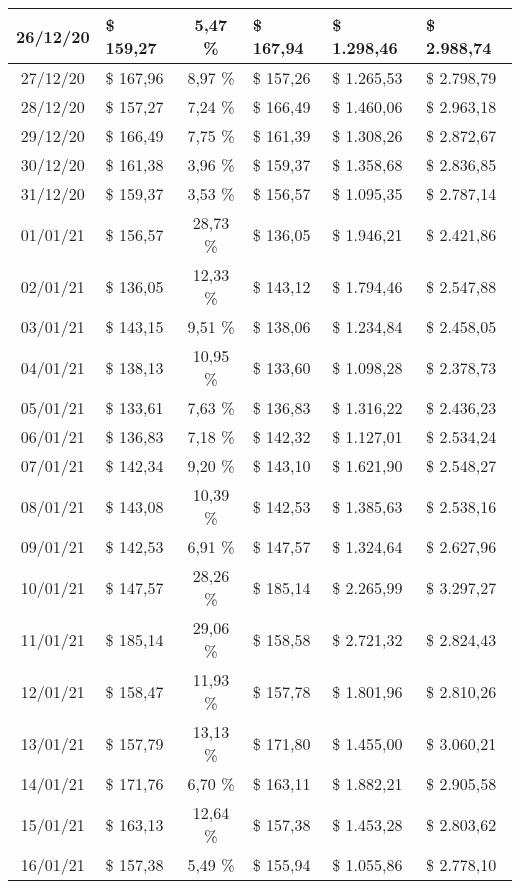 \begin{center}
\begin{small}
\begin{longtable}{|c|l|c|l|l|l|}
26/12/20 & \$ 159,27 & 5,47 \% & \$ 167,94 & \$ 1.298,46 & \$ 2.988,74 \\ \hline
27/12/20 & \$ 167,96 & 8,97 \% & \$ 157,26 & \$ 1.265,53 & \$ 2.798,79 \\ \hline
28/12/20 & \$ 157,27 & 7,24 \% & \$ 166,49 & \$ 1.460,06 & \$ 2.963,18 \\ \hline
29/12/20 & \$ 166,49 & 7,75 \% & \$ 161,39 & \$ 1.308,26 & \$ 2.872,67 \\ \hline
30/12/20 & \$ 161,38 & 3,96 \% & \$ 159,37 & \$ 1.358,68 & \$ 2.836,85 \\ \hline
31/12/20 & \$ 159,37 & 3,53 \% & \$ 156,57 & \$ 1.095,35 & \$ 2.787,14 \\ \hline
01/01/21 & \$ 156,57 & 28,73 \% & \$ 136,05 & \$ 1.946,21 & \$ 2.421,86 \\ \hline
02/01/21 & \$ 136,05 & 12,33 \% & \$ 143,12 & \$ 1.794,46 & \$ 2.547,88 \\ \hline
03/01/21 & \$ 143,15 & 9,51 \% & \$ 138,06 & \$ 1.234,84 & \$ 2.458,05 \\ \hline
04/01/21 & \$ 138,13 & 10,95 \% & \$ 133,60 & \$ 1.098,28 & \$ 2.378,73 \\ \hline
05/01/21 & \$ 133,61 & 7,63 \% & \$ 136,83 & \$ 1.316,22 & \$ 2.436,23 \\ \hline
06/01/21 & \$ 136,83 & 7,18 \% & \$ 142,32 & \$ 1.127,01 & \$ 2.534,24 \\ \hline
07/01/21 & \$ 142,34 & 9,20 \% & \$ 143,10 & \$ 1.621,90 & \$ 2.548,27 \\ \hline
08/01/21 & \$ 143,08 & 10,39 \% & \$ 142,53 & \$ 1.385,63 & \$ 2.538,16 \\ \hline
09/01/21 & \$ 142,53 & 6,91 \% & \$ 147,57 & \$ 1.324,64 & \$ 2.627,96 \\ \hline
10/01/21 & \$ 147,57 & 28,26 \% & \$ 185,14 & \$ 2.265,99 & \$ 3.297,27 \\ \hline
11/01/21 & \$ 185,14 & 29,06 \% & \$ 158,58 & \$ 2.721,32 & \$ 2.824,43 \\ \hline
12/01/21 & \$ 158,47 & 11,93 \% & \$ 157,78 & \$ 1.801,96 & \$ 2.810,26 \\ \hline
13/01/21 & \$ 157,79 & 13,13 \% & \$ 171,80 & \$ 1.455,00 & \$ 3.060,21 \\ \hline
14/01/21 & \$ 171,76 & 6,70 \% & \$ 163,11 & \$ 1.882,21 & \$ 2.905,58 \\ \hline
15/01/21 & \$ 163,13 & 12,64 \% & \$ 157,38 & \$ 1.453,28 & \$ 2.803,62 \\ \hline
16/01/21 & \$ 157,38 & 5,49 \% & \$ 155,94 & \$ 1.055,86 & \$ 2.778,10 \\ \hline

\end{longtable}
\end{small}
\end{center}
